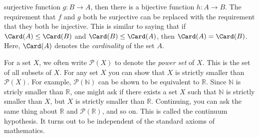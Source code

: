         surjective function $g:B\rightarrow{A}$, then there
        is a bijective function $h:A\rightarrow{B}$. The
        requirement that $f$ and $g$ both be surjective
        can be replaced with the requirement that they both
        be injective. This is similar to saying that if
        $\Card(A)\leq\Card(B)$ and $\Card(B)\leq\Card(A)$,
        then $\Card(A)=\Card(B)$. Here, $\Card(A)$ denotes
        the \textit{cardinality} of the set $A$.
        \par\hfill\par
        \vspace{-2ex}
        For a set $X$, we often write $\mathcal{P}(X)$ to denote the
        \textit{power set} of $X$. This is the set of all subsets of $X$.
        For any set $X$ you can show that $X$ is strictly smaller than
        $\mathcal{P}(X)$. For example, $\mathcal{P}(\mathbb{N})$ can be shown
        to be equivalent to $\mathbb{R}$. Since $\mathbb{N}$ is stricly
        smaller than $\mathbb{R}$, one might ask if there exists a set $X$
        such that $\mathbb{N}$ is strictly smaller than $X$, but $X$ is
        strictly smaller than $\mathbb{R}$. Continuing, you can ask the same
        thing about $\mathbb{R}$ and $\mathcal{P}(\mathbb{R})$, and so on.
        This is called the continuum hypothesis. It turns out to be independent
        of the standard axioms of mathematics.
